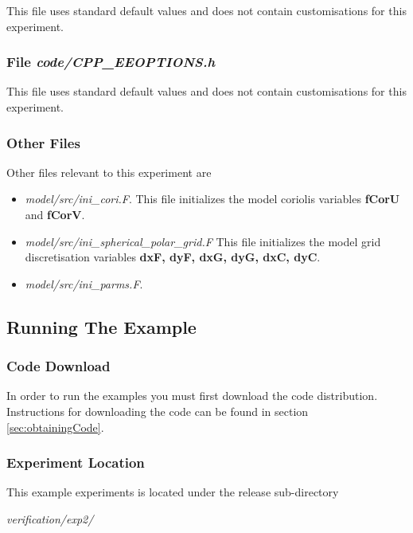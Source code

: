 This file uses standard default values and does not contain
customisations for this experiment.


\subsubsection{File {\it code/CPP\_EEOPTIONS.h}}

This file uses standard default values and does not contain
customisations for this experiment.

\subsubsection{Other Files }

Other files relevant to this experiment are
\begin{itemize}
\item {\it model/src/ini\_cori.F}. This file initializes the model
coriolis variables {\bf fCorU} and {\bf fCorV}.
\item {\it model/src/ini\_spherical\_polar\_grid.F} This file
initializes the model grid discretisation variables {\bf
dxF, dyF, dxG, dyG, dxC, dyC}.
\item {\it model/src/ini\_parms.F}.
\end{itemize}

\subsection{Running The Example}

\subsubsection{Code Download}

 In order to run the examples you must first download the code distribution.
Instructions for downloading the code can be found in section
\ref{sec:obtainingCode}.

\subsubsection{Experiment Location}

 This example experiments is located under the release sub-directory

\vspace{5mm}
{\it verification/exp2/ }


